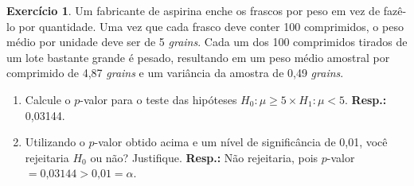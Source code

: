 \documentclass[]{article}
\theoremstyle{definition}
\newtheorem{ex}{Exercício}
\begin{document}
\begin{ex}
Um fabricante de aspirina enche os frascos por peso em vez de fazê-lo por quantidade. Uma vez que cada frasco deve conter 100 comprimidos, o peso médio por unidade deve ser de 5 \textit{grains}. Cada um dos 100 comprimidos tirados de um lote bastante grande é pesado, resultando em um peso médio amostral por comprimido de 4,87 \textit{grains} e um variância da amostra de 0,49 \textit{grains}.
\begin{enumerate}
	\item Calcule o $p$-valor para o teste das hipóteses $H_0 : \mu \geq 5 \times H_1 : \mu < 5$. \textbf{Resp.:} 0,03144.
	\item Utilizando o $p$-valor obtido acima e um nível de significância de 0,01, você rejeitaria $H_0$ ou não? Justifique. \textbf{Resp.:} Não rejeitaria, pois $p$-valor $= 0\text{,}03144 > 0\text{,}01 = \alpha$.
\end{enumerate}
\end{ex}
\end{document}
